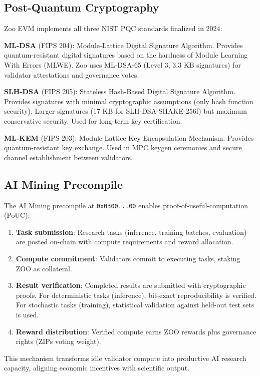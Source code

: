 \documentclass[11pt,a4paper]{article}
\begin{document}
\subsection{Post-Quantum Cryptography}

Zoo EVM implements all three NIST PQC standards finalized in 2024:

\textbf{ML-DSA} (FIPS 204): Module-Lattice Digital Signature Algorithm. Provides quantum-resistant digital signatures based on the hardness of Module Learning With Errors (MLWE). Zoo uses ML-DSA-65 (Level 3, 3.3 KB signatures) for validator attestations and governance votes.

\textbf{SLH-DSA} (FIPS 205): Stateless Hash-Based Digital Signature Algorithm. Provides signatures with minimal cryptographic assumptions (only hash function security). Larger signatures (17 KB for SLH-DSA-SHAKE-256f) but maximum conservative security. Used for long-term key certification.

\textbf{ML-KEM} (FIPS 203): Module-Lattice Key Encapsulation Mechanism. Provides quantum-resistant key exchange. Used in MPC keygen ceremonies and secure channel establishment between validators.

\subsection{AI Mining Precompile}

The AI Mining precompile at \texttt{0x0300...00} enables proof-of-useful-computation (PoUC):

\begin{enumerate}[nosep]
  \item \textbf{Task submission}: Research tasks (inference, training batches, evaluation) are posted on-chain with compute requirements and reward allocation.
  \item \textbf{Compute commitment}: Validators commit to executing tasks, staking ZOO as collateral.
  \item \textbf{Result verification}: Completed results are submitted with cryptographic proofs. For deterministic tasks (inference), bit-exact reproducibility is verified. For stochastic tasks (training), statistical validation against held-out test sets is used.
  \item \textbf{Reward distribution}: Verified compute earns ZOO rewards plus governance rights (ZIPs voting weight).
\end{enumerate}

This mechanism transforms idle validator compute into productive AI research capacity, aligning economic incentives with scientific output.
\end{document}
